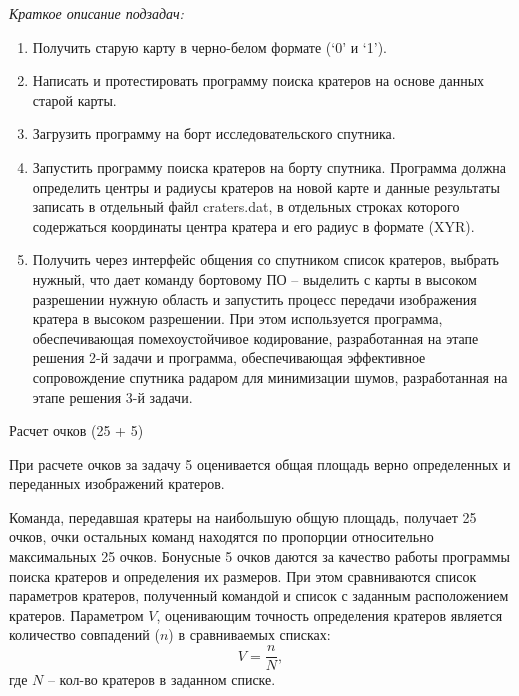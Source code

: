 \textit{Краткое описание подзадач:}
\begin{enumerate}
    \item Получить старую карту в черно-белом формате (‘0’ и ‘1’). 
    \item Написать и протестировать программу поиска кратеров на основе данных старой карты.
    \item Загрузить программу на борт исследовательского спутника.
    \item Запустить программу поиска кратеров на борту спутника. Программа должна определить центры и радиусы кратеров на новой карте и данные результаты записать в отдельный файл craters.dat, в отдельных строках которого содержаться координаты центра кратера и его радиус в формате (XYR).
    \item Получить через интерфейс общения со спутником список кратеров, выбрать нужный, что дает команду бортовому ПО – выделить с карты в высоком разрешении нужную область и запустить процесс передачи изображения кратера в высоком разрешении. При этом используется программа, обеспечивающая помехоустойчивое кодирование, разработанная на этапе решения 2-й задачи и программа, обеспечивающая эффективное сопровождение спутника радаром для минимизации шумов, разработанная на этапе решения 3-й задачи.
\end{enumerate}

\markSection

Расчет очков (25 + 5)

При расчете очков за задачу 5 оценивается общая площадь верно определенных и переданных изображений кратеров.

Команда, передавшая кратеры на наибольшую общую площадь, получает 25 очков, очки остальных команд находятся по пропорции относительно максимальных 25 очков. Бонусные 5 очков даются за качество работы программы поиска кратеров и определения их размеров. При этом сравниваются список параметров кратеров, полученный командой и список с заданным расположением кратеров. Параметром $V$, оценивающим точность определения кратеров является количество совпадений ($n$) в сравниваемых списках:
$$V = \frac{n}{N},$$
где $N$ – кол-во кратеров в заданном списке.